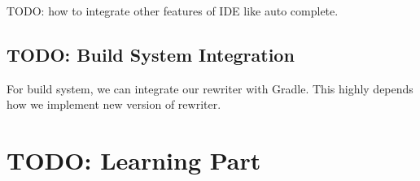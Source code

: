 \documentclass{article}
\begin{document}
TODO: how to integrate other features of IDE like auto complete.

\subsection{TODO: Build System Integration}
\label{sec:build-syst-integr}
For build system, we can integrate our rewriter with Gradle.
This highly depends how we implement new version of rewriter.

\section{TODO: Learning Part}
\label{sec:learning-part}
\end{document}
